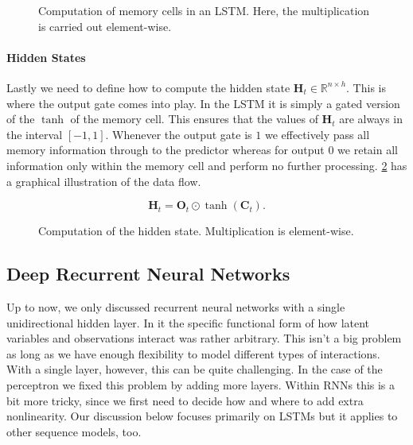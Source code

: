\begin{figure}[hpt]
	\centering
	
	\caption{Computation of memory cells in an LSTM. Here, the multiplication is carried out element-wise.}
	\label{fig:lstm_2}
\end{figure}

\paragraph{Hidden States}

Lastly we need to define how to compute the hidden state $\mathbf{H}_t \in \mathbb{R}^{n \times h}$. This is where the output gate comes into play. In the LSTM it is simply a gated version of the $\tanh$ of the memory cell. This ensures that the values of $\mathbf{H}_t$ are always in the interval $[-1, 1]$. Whenever the output gate is $1$ we effectively pass all memory information through to the predictor whereas for output $0$ we retain all information only within the memory cell and perform no further processing. \cref{fig:lstm_3} has a graphical illustration of the data flow.

$$\mathbf{H}_t = \mathbf{O}_t \odot \tanh(\mathbf{C}_t).$$

\begin{figure}[hpt]
	\centering
	
	\caption{Computation of the hidden state. Multiplication is element-wise.}
	\label{fig:lstm_3}
\end{figure}

\subsection{Deep Recurrent Neural Networks}

Up to now, we only discussed recurrent neural networks with a single unidirectional hidden layer. In it the specific functional form of how latent variables and observations interact was rather arbitrary. This isn't a big problem as long as we have enough flexibility to model different types of interactions. With a single layer, however, this can be quite challenging. In the case of the perceptron we fixed this problem by adding more layers. Within RNNs this is a bit more tricky, since we first need to decide how and where to add extra nonlinearity. Our discussion below focuses primarily on LSTMs but it applies to other sequence models, too.

